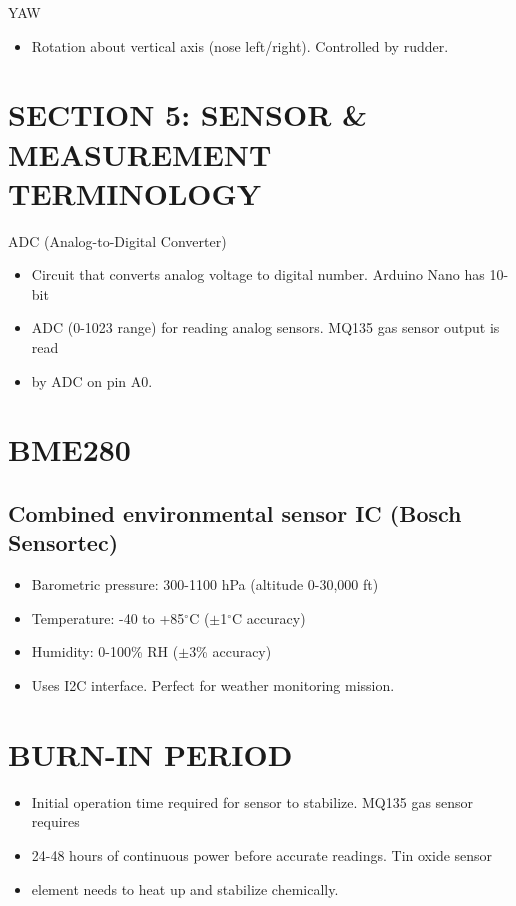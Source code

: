 \documentclass[11pt,letterpaper]{article}
\begin{document}
YAW\par

\begin{itemize}
  \item Rotation about vertical axis (nose left/right). Controlled by rudder.
\end{itemize}

\section{SECTION 5: SENSOR \& MEASUREMENT TERMINOLOGY}

ADC (Analog-to-Digital Converter)\par

\begin{itemize}
  \item Circuit that converts analog voltage to digital number. Arduino Nano has 10-bit
  \item ADC (0-1023 range) for reading analog sensors. MQ135 gas sensor output is read
  \item by ADC on pin A0.
\end{itemize}

\section{BME280}

\subsection{Combined environmental sensor IC (Bosch Sensortec)}

\begin{itemize}
  \item Barometric pressure: 300-1100 hPa (altitude 0-30,000 ft)
  \item Temperature: -40 to +85$^\circ$C ($\pm$1$^\circ$C accuracy)
  \item Humidity: 0-100\% RH ($\pm$3\% accuracy)
  \item Uses I2C interface. Perfect for weather monitoring mission.
\end{itemize}

\section{BURN-IN PERIOD}

\begin{itemize}
  \item Initial operation time required for sensor to stabilize. MQ135 gas sensor requires
  \item 24-48 hours of continuous power before accurate readings. Tin oxide sensor
  \item element needs to heat up and stabilize chemically.
\end{itemize}
\end{document}
